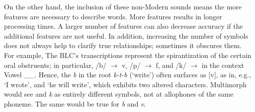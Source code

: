 On the other hand, the inclusion of these non-Modern 
sounds means the more features are necessary to describe 
words. More features results in longer processing times. 
A larger number of features can also decrease accuracy 
if the additional features are not useful. 
In addition, increasing the number of symbols does not 
always help to clarify true relationships; sometimes it 
obscures them. For example, The BLC's transcriptions 
represent the spirantization of the certain oral obstruents; 
in particular, /b/ $\to$ v, /p/ $\to$ f, and /k/ $\to$  
in the context
Vowel \_\_. Hence, the \textit{b} in the root \textit{k-t-b} 
(`write') often surfaces as [v], as in, e.g.,  
`I wrote', and 
 `he will write', which exhibits 
two altered characters. Multimorph would see \textit{} 
and \textit{k} as 
entirely different symbols, not at allophones
of the same phoneme. The same would be true for \textit{b} 
and \textit{v}.  


